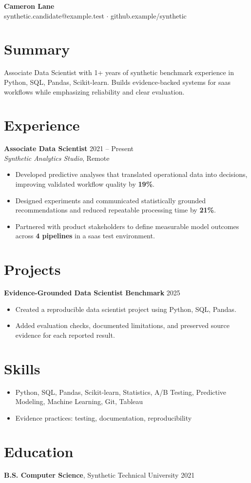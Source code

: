 \documentclass[10pt,letterpaper]{article}
\newcommand{\resumeItem}[1]{\item #1}
\newcommand{\resumeItemListStart}{\begin{itemize}[leftmargin=*]}
\newcommand{\resumeItemListEnd}{\end{itemize}}
\begin{document}
\begin{center}
{\Large \textbf{Cameron Lane}}\\
synthetic.candidate@example.test $\cdot$ github.example/synthetic
\end{center}

\section*{Summary}
Associate Data Scientist with 1+ years of synthetic benchmark experience in Python, SQL, Pandas, Scikit-learn. Builds evidence-backed systems for saas workflows while emphasizing reliability and clear evaluation.

\section*{Experience}
\textbf{Associate Data Scientist} \hfill 2021 -- Present\\
\textit{Synthetic Analytics Studio}, Remote
\resumeItemListStart
  \resumeItem{Developed predictive analyses that translated operational data into decisions, improving validated workflow quality by \textbf{19\%}.}
  \resumeItem{Designed experiments and communicated statistically grounded recommendations and reduced repeatable processing time by \textbf{21\%}.}
  \resumeItem{Partnered with product stakeholders to define measurable model outcomes across \textbf{4 pipelines} in a saas test environment.}
\resumeItemListEnd

\section*{Projects}
\textbf{Evidence-Grounded Data Scientist Benchmark} \hfill 2025
\resumeItemListStart
  \resumeItem{Created a reproducible data scientist project using Python, SQL, Pandas.}
  \resumeItem{Added evaluation checks, documented limitations, and preserved source evidence for each reported result.}
\resumeItemListEnd

\section*{Skills}
\resumeItemListStart
  \resumeItem{Python, SQL, Pandas, Scikit-learn, Statistics, A/B Testing, Predictive Modeling, Machine Learning, Git, Tableau}
  \resumeItem{Evidence practices: testing, documentation, reproducibility}
\resumeItemListEnd

\section*{Education}
\textbf{B.S. Computer Science}, Synthetic Technical University \hfill 2021
\end{document}

